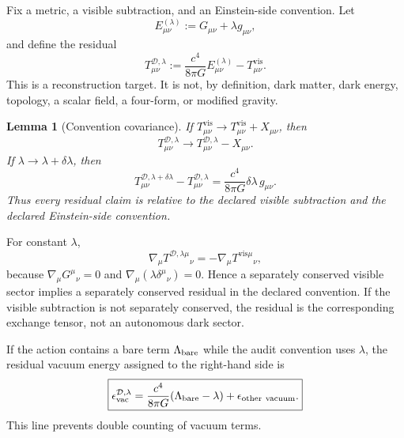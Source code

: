 \documentclass[
  aps,
  prd,
  reprint,
  superscriptaddress,
  floatfix,
  nofootinbib,
  longbibliography
]{revtex4-2}
\theoremstyle{plain}
\newtheorem{lemma}[theorem]{Lemma}
\theoremstyle{definition}
\theoremstyle{remark}
\newcommand{\D}{\mathcal D}
\newcommand{\vis}{\mathrm{vis}}
\begin{document}
Fix a metric, a visible subtraction, and an Einstein-side convention.  Let
\begin{equation}
E^{(\lambda)}_{\mu\nu}:=G_{\mu\nu}+\lambda g_{\mu\nu},
\label{eq:Elambda}
\end{equation}
and define the residual
\begin{equation}
\boxed{
T^{\D,\lambda}_{\mu\nu}:=\frac{c^4}{8\pi G}E^{(\lambda)}_{\mu\nu}-T^{\vis}_{\mu\nu}.
}
\label{eq:residual}
\end{equation}
This is a reconstruction target.  It is not, by definition, dark matter, dark energy, topology, a scalar field, a four-form, or modified gravity.

\begin{lemma}[Convention covariance]
If \(T^{\vis}_{\mu\nu}\to T^{\vis}_{\mu\nu}+X_{\mu\nu}\), then
\begin{equation}
T^{\D,\lambda}_{\mu\nu}\to T^{\D,\lambda}_{\mu\nu}-X_{\mu\nu}.
\end{equation}
If \(\lambda\to\lambda+\delta\lambda\), then
\begin{equation}
T^{\D,\lambda+\delta\lambda}_{\mu\nu}-T^{\D,\lambda}_{\mu\nu}
=\frac{c^4}{8\pi G}\delta\lambda\,g_{\mu\nu}.
\label{eq:lambda_shift}
\end{equation}
Thus every residual claim is relative to the declared visible subtraction and the declared Einstein-side convention.
\end{lemma}

For constant \(\lambda\),
\begin{equation}
\nabla_\mu T^{\D,\lambda\mu}{}_{\nu}
=-\nabla_\mu T^{\vis\mu}{}_{\nu},
\label{eq:residual_conservation}
\end{equation}
because \(\nabla_\mu G^\mu{}_{\nu}=0\) and \(\nabla_\mu(\lambda\delta^\mu{}_{\nu})=0\).  Hence a separately conserved visible sector implies a separately conserved residual in the declared convention.  If the visible subtraction is not separately conserved, the residual is the corresponding exchange tensor, not an autonomous dark sector.

If the action contains a bare term \(\Lambda_{\rm bare}\) while the audit convention uses \(\lambda\), the residual vacuum energy assigned to the right-hand side is
\begin{equation}
\boxed{
\epsilon_{\rm vac}^{\D,\lambda}
=\frac{c^4}{8\pi G}(\Lambda_{\rm bare}-\lambda)+\epsilon_{\rm other\ vacuum}.
}
\label{eq:vac_conv_general}
\end{equation}
This line prevents double counting of vacuum terms.
\end{document}
